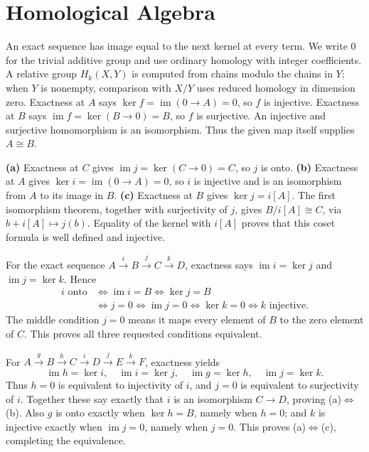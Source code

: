 \section{Homological Algebra}
An exact sequence has image equal to the next kernel at every term. We write $0$ for the trivial additive group and use ordinary homology with integer coefficients. A relative group $H_k(X,Y)$ is computed from chains modulo the chains in $Y$; when $Y$ is nonempty, comparison with $X/Y$ uses reduced homology in dimension zero.
Exactness at $A$ says $\ker f=\operatorname{im}(0\to A)=0$, so $f$ is injective. Exactness at $B$ says $\operatorname{im}f=\ker(B\to0)=B$, so $f$ is surjective. An injective and surjective homomorphism is an isomorphism. Thus the given map itself supplies $A\cong B$.

\textbf{(a)} Exactness at $C$ gives $\operatorname{im}j=\ker(C\to0)=C$, so $j$ is onto.
\textbf{(b)} Exactness at $A$ gives $\ker i=\operatorname{im}(0\to A)=0$, so $i$ is injective and is an isomorphism from $A$ to its image in $B$.
\textbf{(c)} Exactness at $B$ gives $\ker j=i[A]$. The first isomorphism theorem, together with surjectivity of $j$, gives $B/i[A]\cong C$, via $b+i[A]\mapsto j(b)$. Equality of the kernel with $i[A]$ proves that this coset formula is well defined and injective.

For the exact sequence $A\xrightarrow{i}B\xrightarrow{j}C\xrightarrow{k}D$, exactness says $\operatorname{im}i=\ker j$ and $\operatorname{im}j=\ker k$. Hence
\[
\begin{aligned}
i\text{ onto}
&\iff\operatorname{im}i=B
\iff\ker j=B\\
&\iff j=0
\iff\operatorname{im}j=0
\iff\ker k=0
\iff k\text{ injective}.
\end{aligned}
\]
The middle condition $j=0$ means it maps every element of $B$ to the zero element of $C$. This proves all three requested conditions equivalent.

For $A\xrightarrow g B\xrightarrow h C\xrightarrow i D\xrightarrow j E\xrightarrow k F$, exactness yields
\[
\operatorname{im}h=\ker i,\quad \operatorname{im}i=\ker j,
\quad \operatorname{im}g=\ker h,\quad\operatorname{im}j=\ker k.
\]
Thus $h=0$ is equivalent to injectivity of $i$, and $j=0$ is equivalent to surjectivity of $i$. Together these say exactly that $i$ is an isomorphism $C\to D$, proving (a)$\iff$(b).
Also $g$ is onto exactly when $\ker h=B$, namely when $h=0$; and $k$ is injective exactly when $\operatorname{im}j=0$, namely when $j=0$. This proves (a)$\iff$(c), completing the equivalence.

